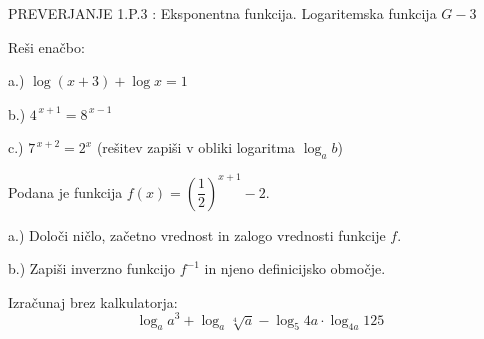 \documentclass[a4paper,12pt]{letter}
\renewcommand{\headrulewidth}{3pt}
\renewcommand{\headrulewidth}{0.3pt}
\newcounter{tocke}
\begin{document}
\pagestyle{fancy}
\renewcommand\headrulewidth{0pt}
\lhead{}\chead{}\rhead{}
\rfoot{\vspace*{-2\baselineskip}}
\renewcommand{\vec}{\overrightarrow}
\everymath{\displaystyle}

\begin{minipage}{20cm}
\begin{bclogo}[couleur=brown!40,
  arrondi=0,ombre=true, couleurOmbre=gray!50,
logo =\bcplume,
  noborder=true]
{\textrm{{\Large{PREVERJANJE 1.P.3} \Huge{}:
\large{Eksponentna funkcija. Logaritemska funkcija} \hfill $G-3$}}}
\end{bclogo}
\end{minipage}
\begin{minipage}{20cm}
\end{minipage}


\def\tockeA{4+4+4}
\begin{naloga}[\hfill $\tockeA$] \addtocounter{tocke}{\numexpr\tockeA\relax}
Re\v{s}i ena\v{c}bo:

a.) $\log(x+3)+\log x=1$

b.) $4^{\,x+1}=8^{\,x-1}$

c.) $7^{\,x+2}=2^{x}$ \quad (re\v{s}itev zapi\v{s}i v obliki logaritma $\log_a b$)
\end{naloga}\newpage

\def\tockeB{2+1+1+3}
\begin{naloga}[\hfill $\tockeB$] \addtocounter{tocke}{\numexpr\tockeB\relax}
Podana je funkcija $f(x)=\left(\dfrac{1}{2}\right)^{x+1}-2$.

a.) Dolo\v{c}i ni\v{c}lo, za\v{c}etno vrednost in zalogo vrednosti funkcije $f$.

b.) Zapi\v{s}i inverzno funkcijo $f^{-1}$ in njeno definicijsko obmo\v{c}je.
\end{naloga}\newpage

\def\tockeC{4}
\begin{naloga}[\hfill $\tockeC$] \addtocounter{tocke}{\numexpr\tockeC\relax}
Izra\v{c}unaj brez kalkulatorja:
$$\log_a a^3+\log_a \sqrt[4]{a}-\log_5 4a\cdot\log_{4a} 125$$
\end{naloga}\newpage
\end{document}
